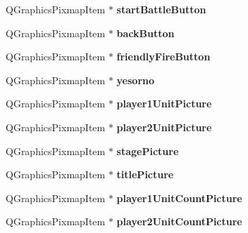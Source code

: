 \begin{DoxyCompactItemize}
\item 
Q\+Graphics\+Pixmap\+Item $\ast$ {\bfseries start\+Battle\+Button}\hypertarget{class_game_menu_a63e87ded92f5c386c776fdf0db70c391}{}\label{class_game_menu_a63e87ded92f5c386c776fdf0db70c391}

\item 
Q\+Graphics\+Pixmap\+Item $\ast$ {\bfseries back\+Button}\hypertarget{class_game_menu_a5095d622706253beec6b63056c09e872}{}\label{class_game_menu_a5095d622706253beec6b63056c09e872}

\item 
Q\+Graphics\+Pixmap\+Item $\ast$ {\bfseries friendly\+Fire\+Button}\hypertarget{class_game_menu_acbf50def7da8afa135d24e6a0f8a8a92}{}\label{class_game_menu_acbf50def7da8afa135d24e6a0f8a8a92}

\item 
Q\+Graphics\+Pixmap\+Item $\ast$ {\bfseries yesorno}\hypertarget{class_game_menu_ad650020a1b9c6076803203746289cca3}{}\label{class_game_menu_ad650020a1b9c6076803203746289cca3}

\item 
Q\+Graphics\+Pixmap\+Item $\ast$ {\bfseries player1\+Unit\+Picture}\hypertarget{class_game_menu_a7b6ec049efa3d2edb073b0c6f8d4410c}{}\label{class_game_menu_a7b6ec049efa3d2edb073b0c6f8d4410c}

\item 
Q\+Graphics\+Pixmap\+Item $\ast$ {\bfseries player2\+Unit\+Picture}\hypertarget{class_game_menu_af1854743b63b9756bfd6ce0761918e7e}{}\label{class_game_menu_af1854743b63b9756bfd6ce0761918e7e}

\item 
Q\+Graphics\+Pixmap\+Item $\ast$ {\bfseries stage\+Picture}\hypertarget{class_game_menu_ac9149690e856b17578f3f7fdb932f7a1}{}\label{class_game_menu_ac9149690e856b17578f3f7fdb932f7a1}

\item 
Q\+Graphics\+Pixmap\+Item $\ast$ {\bfseries title\+Picture}\hypertarget{class_game_menu_ad6a103544d02d3cb04f33dfe35676c00}{}\label{class_game_menu_ad6a103544d02d3cb04f33dfe35676c00}

\item 
Q\+Graphics\+Pixmap\+Item $\ast$ {\bfseries player1\+Unit\+Count\+Picture}\hypertarget{class_game_menu_a1fb70748425976821089be584d3f3840}{}\label{class_game_menu_a1fb70748425976821089be584d3f3840}

\item 
Q\+Graphics\+Pixmap\+Item $\ast$ {\bfseries player2\+Unit\+Count\+Picture}\hypertarget{class_game_menu_aa68b9697560092eb9c78d10945df0b1f}{}\label{class_game_menu_aa68b9697560092eb9c78d10945df0b1f}


\end{DoxyCompactItemize}
